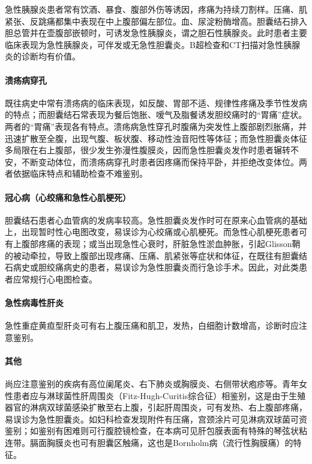 急性胰腺炎患者常有饮酒、暴食、腹部外伤等诱因，疼痛为持续刀割样。压痛、肌紧张、反跳痛都集中表现在中上腹部偏左部位。血、尿淀粉酶增高。胆囊结石排入胆总管并在壶腹部嵌顿时，可诱发急性胰腺炎，谓之胆石性胰腺炎。此时患者主要临床表现为急性胰腺炎，可伴发或无急性胆囊炎。B超检查和CT扫描对急性胰腺炎的诊断均有价值。

\paragraph{溃疡病穿孔}

既往病史中常有溃疡病的临床表现，如反酸、胃部不适、规律性疼痛及季节性发病的特点；而胆囊结石常表现为餐后饱胀、嗳气及脂餐诱发胆绞痛时的“胃痛”症状。两者的“胃痛”表现各有特点。溃疡病急性穿孔时腹痛为突发性上腹部剧烈胀痛，并迅速扩散至全腹，出现气腹、板状腹、移动性浊音阳性等体征；而急性胆囊炎体征多局限在右上腹部，很少发生弥漫性腹膜炎，因而急性胆囊炎发作时患者辗转不安，不断变动体位，而溃疡病穿孔时患者因疼痛而保持平卧，并拒绝改变体位。两者依据临床特点和辅助检查不难鉴别。

\paragraph{冠心病（心绞痛和急性心肌梗死）}

胆囊结石患者心血管病的发病率较高。急性胆囊炎发作时可在原来心血管病的基础上，出现暂时性心电图改变，易误诊为心绞痛或心肌梗死。而急性心肌梗死患者可有上腹部疼痛的表现；或当出现急性心衰时，肝脏急性淤血肿胀，引起Glisson鞘的被动牵拉，导致上腹部出现疼痛、压痛、肌紧张等症状和体征，在既往有胆囊结石病史或胆绞痛病史的患者，易误诊为急性胆囊炎而行急诊手术。因此，对此类患者应常规行心电图检查。

\paragraph{急性病毒性肝炎}

急性重症黄疸型肝炎可有右上腹压痛和肌卫，发热，白细胞计数增高，诊断时应注意鉴别。

\paragraph{其他}

尚应注意鉴别的疾病有高位阑尾炎、右下肺炎或胸膜炎、右侧带状疱疹等。青年女性患者应与淋球菌性肝周围炎（Fitz-Hugh-Curitis综合征）相鉴别，这是由于生殖器官的淋病双球菌感染扩散至右上腹，引起肝周围炎，可有发热、右上腹部疼痛，易误诊为急性胆囊炎。如妇科检查发现附件有压痛，宫颈涂片可见淋病双球菌可资鉴别；如鉴别有困难则可行腹腔镜检查，在本病可见肝包膜表面有特殊的琴弦状粘连带。膈面胸膜炎也可有胆囊区触痛，这也是Bornholm病（流行性胸膜痛）的特征。

